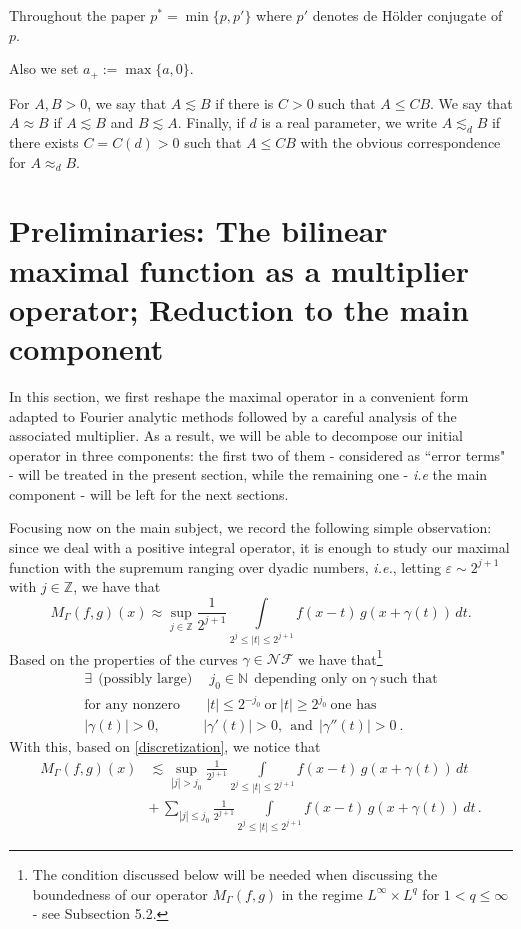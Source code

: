 \documentclass{amsart}
\newcommand{\Z}{\mathbb{Z}}
\newcommand{\N}{\mathbb{N}}
\newcommand{\e}{\varepsilon}
\newcommand{\g}{\gamma}
\newcommand{\NF}{\mathcal{NF}}
\theoremstyle{definition}
\theoremstyle{remark}
\numberwithin{equation}{section}
\begin{document}
Throughout the paper $p^*=\min\{p,p'\}$ where $p'$ denotes de H\"older conjugate of $p$.

Also we set $a_+:=\max\{a,0\}$.

For $A, B>0$, we say that $A\lesssim B$ if there is $C>0$ such that $A\le CB$.  We say that $A\approx B$ if $A\lesssim B$ and $B\lesssim A$. Finally, if $d$ is a real parameter, we write $A\lesssim_d B$ if there exists $C=C(d)>0$ such that $A\le CB$ with the obvious correspondence for $A\approx_d B$.


\section{Preliminaries: The bilinear maximal function as a multiplier operator; Reduction to the main component}

In this section, we first reshape the maximal operator in a convenient form adapted to Fourier analytic methods followed by a careful analysis of the associated multiplier. As a result, we will be able to decompose our initial operator in three components: the first two of them - considered as ``error terms" - will be treated in the present section, while the remaining one - \emph{i.e} the main component - will be left for the next sections.



Focusing now on the main subject, we record the following simple observation: since we deal with a positive integral operator, it is enough to study our maximal function with the supremum ranging over dyadic numbers, \textit{i.e.}, letting  $\e\sim 2^{j+1}$ with $j\in\Z$, we have that
\begin{equation}\label{discretization}
M_{\Gamma}(f,g)(x)\approx\sup\limits_{j\in\Z}\frac{1}{2^{j+1}}\int\limits_{2^j\le|t|\le2^{j+1}} f(x-t)\,g(x+\gamma(t))\,dt.
\end{equation}
Based on the properties of the curves $\g\in\NF$ we have that\footnote{The condition discussed below will be needed when discussing the boundedness of our operator $M_{\Gamma}(f,g)$ in the regime $L^{\infty}\times L^q$ for $1<q\leq \infty$ - see Subsection 5.2.}
\begin{align}
\exists\:\:\textrm{(possibly large)}&\:\: j_0\in\N\:\:\textrm{depending only on}\:\g\:\textrm{such that} \label{threshold}\\
\textrm{for any nonzero}&\:|t|\leq 2^{-j_0}\:\textrm{or}\:|t|\geq 2^{j_0}\:\textrm{one has}\nonumber\\
|\g(t)|>0,\:\: &|\g'(t)|>0,\:\:\textrm{and}\:\:|\g''(t)|>0\:.\label{threshold1}
\end{align}
With this, based on \eqref{discretization}, we notice that
\begin{align}
M_{\Gamma}(f,g)(x)&\lesssim \sup\limits_{|j|>j_0}\frac{1}{2^{j+1}}\int\limits_{2^j\le|t|\le2^{j+1}} f(x-t)\,g(x+\gamma(t))\,dt\,\label{discretizationsI}\\
&+\,\sum_{|j|\leq j_0}\frac{1}{2^{j+1}}\int\limits_{2^j\le|t|\le2^{j+1}} f(x-t)\,g(x+\gamma(t))\,dt\,.\label{discretizationsII}
\end{align}
\end{document}
